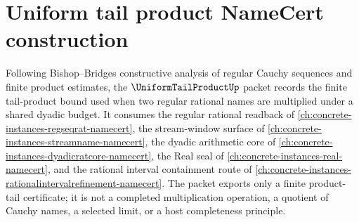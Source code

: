 \chapter{Uniform tail product NameCert construction}
\label{ch:concrete-instances-uniform-tail-product-namecert}

Following Bishop--Bridges constructive analysis of regular Cauchy sequences and finite product estimates, the $\UniformTailProductUp$ packet records the finite tail-product bound used when two regular rational names are multiplied under a shared dyadic budget. It consumes the regular rational readback of \autoref{ch:concrete-instances-regseqrat-namecert}, the stream-window surface of \autoref{ch:concrete-instances-streamname-namecert}, the dyadic arithmetic core of \autoref{ch:concrete-instances-dyadicratcore-namecert}, the Real seal of \autoref{ch:concrete-instances-real-namecert}, and the rational interval containment route of \autoref{ch:concrete-instances-rationalintervalrefinement-namecert}. The packet exports only a finite product-tail certificate; it is not a completed multiplication operation, a quotient of Cauchy names, a selected limit, or a host completeness principle.

